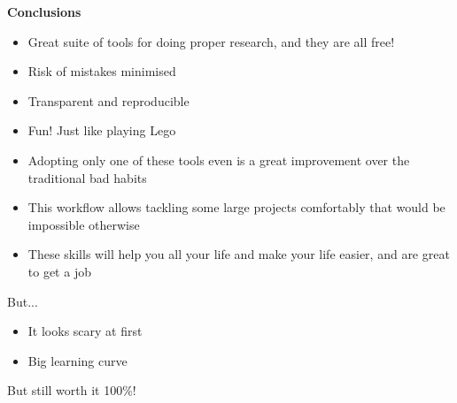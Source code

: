 \documentclass[9pt,xcolor=pdftex,dvipsnames,table]{beamer}
\begin{document}
\begin{frame}{\textbf{Conclusions}}
\begin{itemize}
\item Great suite of tools for doing proper research, and they are all free!
\item Risk of mistakes minimised
\item Transparent and reproducible
\item Fun! Just like playing Lego
\item Adopting only one of these tools even is a great improvement
  over the traditional bad habits
\item This workflow allows tackling some large projects comfortably
  that would be impossible otherwise
\item These skills will help you all your life and make your life
  easier, and are great to get a job
\end{itemize}
But...
\begin{itemize}
\item It looks scary at first
\item Big learning curve
\end{itemize}
But still worth it 100\%!
\end{frame}
\end{document}

